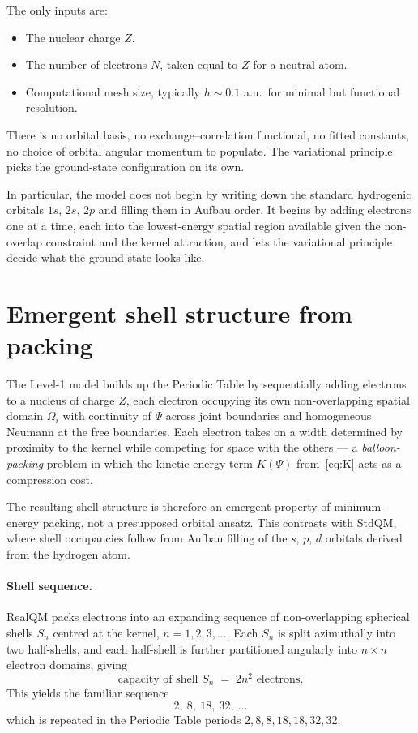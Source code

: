 The only inputs are:
\begin{itemize}
\item The nuclear charge $Z$.
\item The number of electrons $N$, taken equal to $Z$ for a neutral atom.
\item Computational mesh size, typically $h \sim 0.1$ a.u.\ for minimal but functional resolution.
\end{itemize}
There is no orbital basis, no exchange--correlation functional, no fitted constants, no choice of orbital angular momentum to populate. The variational principle picks the ground-state configuration on its own.

In particular, the model does not begin by writing down the standard hydrogenic orbitals $1s$, $2s$, $2p$ and filling them in Aufbau order. It begins by adding electrons one at a time, each into the lowest-energy spatial region available given the non-overlap constraint and the kernel attraction, and lets the variational principle decide what the ground state looks like.

\section{Emergent shell structure from packing}\label{sec:packing}

The Level-1 model builds up the Periodic Table by sequentially adding electrons to a nucleus of charge $Z$, each electron occupying its own non-overlapping spatial domain $\Omega_i$ with continuity of $\Psi$ across joint boundaries and homogeneous Neumann at the free boundaries. Each electron takes on a width determined by proximity to the kernel while competing for space with the others --- a \emph{balloon-packing} problem in which the kinetic-energy term $K(\Psi)$ from~\eqref{eq:K} acts as a compression cost.

The resulting shell structure is therefore an emergent property of minimum-energy packing, not a presupposed orbital ansatz. This contrasts with StdQM, where shell occupancies follow from Aufbau filling of the $s$, $p$, $d$ orbitals derived from the hydrogen atom.

\paragraph{Shell sequence.}
RealQM packs electrons into an expanding sequence of non-overlapping spherical shells $S_n$ centred at the kernel, $n = 1, 2, 3, \ldots$. Each $S_n$ is split azimuthally into two half-shells, and each half-shell is further partitioned angularly into $n \times n$ electron domains, giving
\[
\text{capacity of shell } S_n \;=\; 2n^2 \text{ electrons.}
\]
This yields the familiar sequence
\[
2,\ 8,\ 18,\ 32,\ \ldots
\]
which is repeated in the Periodic Table periods $2, 8, 8, 18, 18, 32, 32$.


